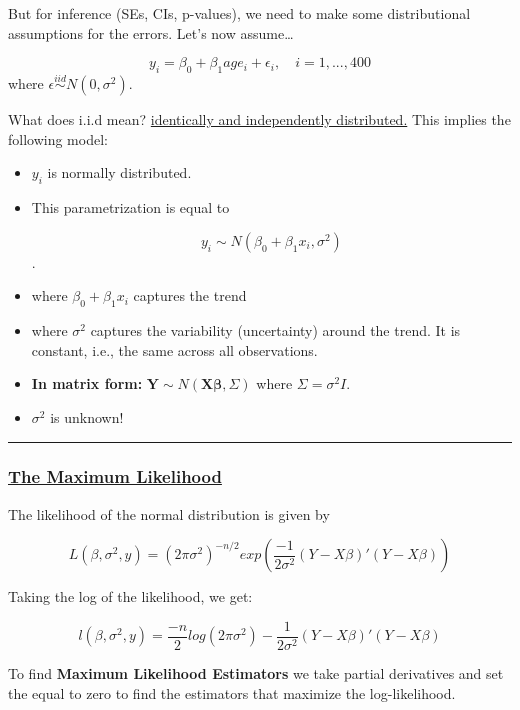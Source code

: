 \documentclass[
  letterpaper,
  DIV=11,
  numbers=noendperiod]{scrreprt}
\begin{document}
But for inference (SEs, CIs, p-values), we need to make some
distributional assumptions for the errors. Let's now assume\ldots{}

\[
y_i = \beta_0 + \beta_1 age_i + \epsilon_i, \quad i=1, ..., 400
\] where \(\epsilon \overset{iid}{\sim} N(0, \sigma^2)\).

What does i.i.d mean? \ul{identically and independently distributed.}
This implies the following model:

\begin{itemize}
\item
  \(y_i\) is normally distributed.
\item
  This parametrization is equal to

  \[y_i \sim N(\beta_0 + \beta_1 x_i,\sigma^2)\].
\item
  where \(\beta_0 + \beta_1 x_i\) captures the trend
\item
  where \(\sigma^2\) captures the variability (uncertainty) around the
  trend. It is constant, i.e., the same across all observations.
\item
  \textbf{In matrix form:}
  \(\mathbf{Y} \sim N(\mathbf{X\beta}, \Sigma)\) where
  \(\Sigma = \sigma^2I\).
\item
  \(\sigma^2\) is unknown!
\end{itemize}

\begin{center}\rule{0.5\linewidth}{0.5pt}\end{center}

\hypertarget{the-maximum-likelihood}{%
\subsubsection*{\texorpdfstring{\ul{The Maximum
Likelihood}}{The Maximum Likelihood}}\label{the-maximum-likelihood}}

The likelihood of the normal distribution is given by

\[
L(\beta, \sigma^2, y) = (2\pi \sigma^2)^{-n/2} exp\left(\frac{-1}{2\sigma^2} (Y-X\beta)'(Y-X\beta)\right)
\]

Taking the log of the likelihood, we get:

\[
l(\beta, \sigma^2, y) = \frac{-n}{2} log(2\pi\sigma^2) - \frac{1}{2\sigma^2} (Y-X\beta)'(Y-X\beta)
\]

To find \textbf{Maximum Likelihood Estimators} we take partial
derivatives and set the equal to zero to find the estimators that
maximize the log-likelihood.
\end{document}
